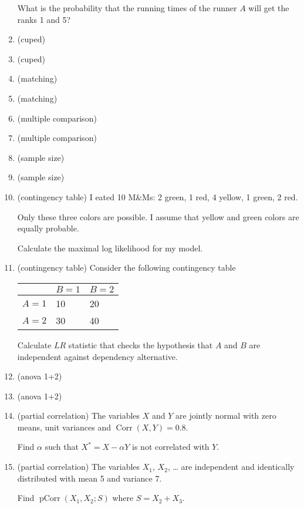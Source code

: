\documentclass[12pt]{article}
\DeclareMathOperator{\Corr}{Corr}
\DeclareMathOperator{\pCorr}{pCorr}
\begin{document}
\begin{enumerate}
    What is the probability that the running times of the runner $A$ will get the ranks 1 and 5?
    
    \item (cuped)
    \item (cuped)
    \item (matching)
    \item (matching)
    \item (multiple comparison)
    \item (multiple comparison)
    \item (sample size)
    \item (sample size)
    \item (contingency table) I eated 10 M\&Ms: 2 green, 1 red, 4 yellow, 1 green, 2 red.  
    
    Only these three colors are possible. I assume that yellow and green colors are equally probable.  
    
    Calculate the maximal log likelihood for my model.  
    \item (contingency table) Consider the following contingency table 
    
    \begin{tabular}{@{}lll@{}}
        \toprule
         & $B=1$ & $B=2$ \\ 
         \midrule
         $A=1$ & 10 & 20 \\
         $A=2$ & 30 & 40 \\
        \bottomrule
        \end{tabular}


    Calculate $LR$ statistic that checks the hypothesis that $A$ and $B$ are independent against dependency alternative. 

    \item (anova 1+2)
    \item (anova 1+2)

    \item (partial correlation) The variables $X$ and $Y$ are jointly normal with zero means,
unit variances and $\Corr(X, Y) = 0.8$. 

Find $\alpha$ such that $X^* = X - \alpha Y$ is not correlated with $Y$. 

\item (partial correlation) The variables $X_1$, $X_2$, \ldots{ } are independent and identically distributed with mean 5 and variance 7. 

Find $\pCorr(X_1, X_2; S)$ where $S = X_2 + X_3$.
    
    
\end{enumerate}
\end{document}
